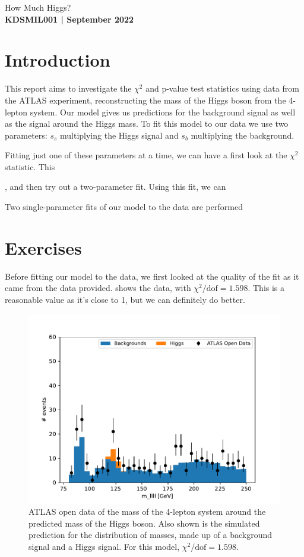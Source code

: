 \documentclass[11pt]{article}
\newcommand{\chisq}{\chi^2}
\newcommand{\chisqdof}{\chi^2/\mathrm{dof}}
\numberwithin{equation}{section}
\numberwithin{figure}{section}
\numberwithin{table}{section}
\begin{document}
\begin{center}
    {\huge How Much Higgs?}\\
    \vspace{0.2in}
    \textbf{KDSMIL001 | September 2022}
    
    
\end{center}

\section{Introduction}\label{sec:Introduction}
This report aims to investigate the $\chi^2$ and p-value test statistics using data from the ATLAS experiment, reconstructing the mass of the Higgs boson from the 4-lepton system. Our model gives us predictions for the background signal as well as the signal around the Higgs mass. To fit this model to our data we use two parameters: $s_s$ multiplying the Higgs signal and $s_b$ multiplying the background. 

Fitting just one of these parameters at a time, we can have a first look at the $\chi^2$ statistic. This 

, and then try out a two-parameter fit. Using this fit, we can

Two single-parameter fits of our model to the data are performed

\section{Exercises}\label{sec:Exercises}
Before fitting our model to the data, we first looked at the quality of the fit as it came from the data provided.  shows the data, with $\chisq/\mathrm{dof}=\num{1.598}$. This is a reasonable value as it's close to 1, but we can definitely do better. 

\begin{figure}[h]
    \begin{center}
        \includegraphics[width=.6\textwidth]{Plots/no_fit_hist.pdf}
        \caption{ATLAS open data of the mass of the 4-lepton system around the predicted mass of the Higgs boson. Also shown is the simulated prediction for the distribution of masses, made up of a background signal and a Higgs signal. For this model, $\chisqdof=\num{1.598}$.}
        \label{fig:no_fit_hist}
    \end{center}
\end{figure}
\end{document}
